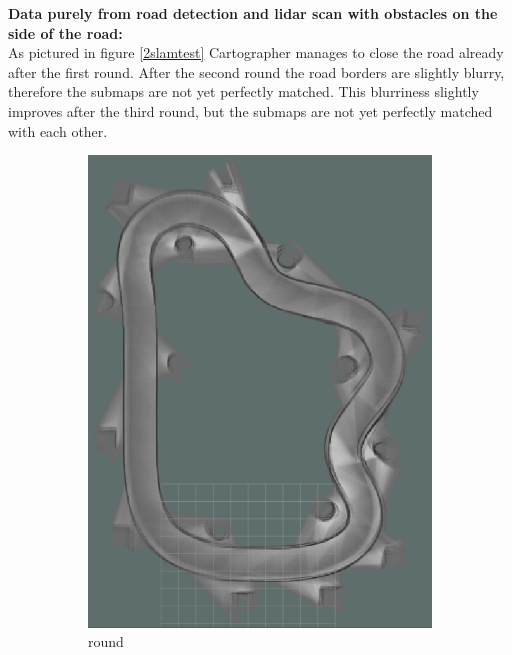 \textbf{Data purely from road detection and lidar scan with obstacles on the side of the road:}\\


As pictured in figure \ref{2slamtest} Cartographer manages to close the road already after the first round. After the second round the road borders are slightly blurry, therefore the submaps are not yet perfectly matched. This blurriness slightly improves after the third round, but the submaps are not yet perfectly matched with each other.

\begin{figure} 
	\centering
	\begin{subfigure}{.3\linewidth}
		\includegraphics[width=\textwidth]{Pictures/2slamtest1}
		\caption{ round}
		\end{subfigure}	
	\begin{subfigure}{.3\linewidth}

\end{subfigure}
\end{figure}
